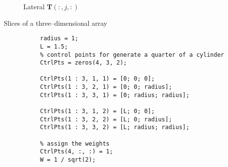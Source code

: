 \begin{itemize}
\begin{itemize}
\begin{figure}[H]
\begin{subfigure}[b]{0.3\textwidth}
                        
                        \caption{Lateral $\mathbf{T}(:, j, :)$}
                        \label{fig:Ch3LateralSlices}
                    \end{subfigure}
                    \caption{Slices of a three--dimensional array}
                    \label{fig:3darray}
            \end{figure}
            \begin{lstlisting}
                radius = 1;
                L = 1.5;
                % control points for generate a quarter of a cylinder
                CtrlPts = zeros(4, 3, 2);

                CtrlPts(1 : 3, 1, 1) = [0; 0; 0];
                CtrlPts(1 : 3, 2, 1) = [0; 0; radius];
                CtrlPts(1 : 3, 3, 1) = [0; radius; radius];

                CtrlPts(1 : 3, 1, 2) = [L; 0; 0];
                CtrlPts(1 : 3, 2, 2) = [L; 0; radius];
                CtrlPts(1 : 3, 3, 2) = [L; radius; radius];

                % assign the weights
                CtrlPts(4, :, :) = 1;
                W = 1 / sqrt(2);


\end{lstlisting}
\end{itemize}
\end{itemize}
